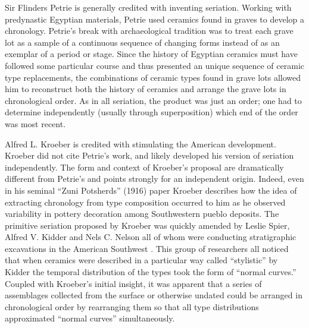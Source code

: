 \documentclass[10pt,letterpaper]{article}
\begin{document}
Sir Flinders Petrie \cite{Petrie:1899aa} is generally credited with inventing seriation. Working with predynastic Egyptian materials, Petrie used ceramics found in graves to develop a chronology. Petrie’s break with archaeological tradition was to treat each grave lot as a sample of a continuous sequence of changing forms instead of as an exemplar of a period or stage. Since the history of Egyptian ceramics must have followed some particular course and thus presented an unique sequence of ceramic type replacements, the combinations of ceramic types found in grave lots allowed him to reconstruct both the history of ceramics and arrange the grave lots in chronological order. As in all seriation, the product was just an order; one had to determine independently (usually through superposition) which end of the order was most recent. 

 Alfred L. Kroeber \cite{Kroeber1916} is credited with stimulating the American development. Kroeber did not cite Petrie’s work, and likely developed his version of seriation independently. The form and context of Kroeber’s proposal are dramatically different from Petrie’s and points strongly for an independent origin. Indeed, even in his seminal “Zuni Potsherds” (1916) paper Kroeber describes how the idea of extracting chronology from type composition occurred to him as he observed variability in pottery decoration among Southwestern pueblo deposits. The primitive seriation proposed by Kroeber was quickly amended by Leslie Spier, Alfred V. Kidder and Nels C. Nelson all of whom were conducting stratigraphic excavations in the American Southwest \cite{Kidder1917,Kroeber1916,Nelson1916,Spier1917,Stein1973aa}. This group of researchers all noticed that when ceramics were described in a particular way  \textemdash called “stylistic” by Kidder \cite{Kidder1917}  \textemdash the temporal distribution of the types took the form of “normal curves.”  Coupled with Kroeber’s initial insight, it was apparent that a series of assemblages collected from the surface or otherwise undated could be arranged in chronological order by rearranging them so that all type distributions approximated “normal curves” simultaneously.
\end{document}
